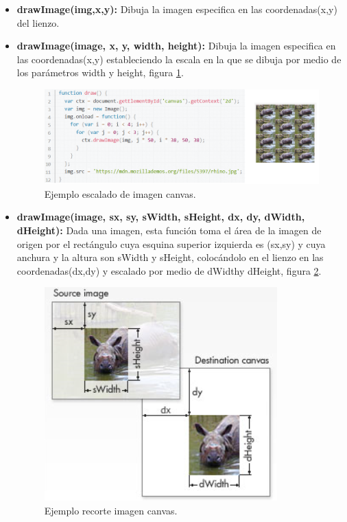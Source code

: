 \begin{itemize}
\item \textbf{drawImage(img,x,y):} Dibuja la imagen especifica en las coordenadas(x,y) del lienzo.
\item \textbf{drawImage(image, x, y, width, height):} Dibuja la imagen especifica en las coordenadas(x,y) estableciendo la escala en la que se dibuja por medio de los parámetros width y height, figura \ref{fig:ImagenScale_Canvas}.
\begin{figure}[!h]
\begin{center}
   \includegraphics[width=0.7\linewidth]{Figures/ImagenScale_Canvas}
	\decoRule
	\caption[Ejemplo escalado de imagen canvas.]{Ejemplo escalado de imagen canvas.}
\label{fig:ImagenScale_Canvas}
\end{center}
\end{figure}
\item \textbf{drawImage(image, sx, sy, sWidth, sHeight, dx, dy, dWidth, dHeight):} Dada una imagen, esta función toma el área de la imagen de origen por el rectángulo cuya esquina superior izquierda es (sx,sy) y cuya anchura y la altura son sWidth y sHeight, colocándolo en el lienzo en las coordenadas(dx,dy) y escalado por medio de dWidthy dHeight, figura \ref{fig:ImagenRecorte_Canvas}.
\begin{figure}[!h]
\begin{center}
   \includegraphics[width=0.3\linewidth]{Figures/ImagenRecorte_Canvas}
	\decoRule
	\caption[Ejemplo recorte imagen canvas.]{Ejemplo recorte imagen canvas.}
   \label{fig:ImagenRecorte_Canvas}
\end{center}
\end{figure}
\end{itemize}

